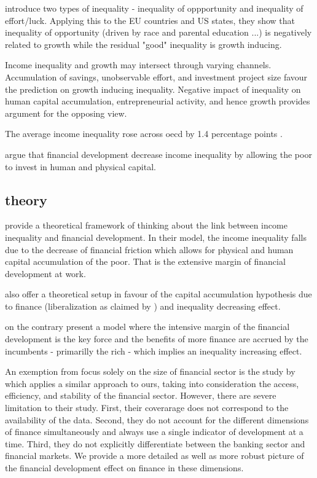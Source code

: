 \documentclass[a4paper,11pt]{article}
\begin{document}
\citet{marrero2013inequality} introduce two types of inequality - inequality of oppportunity and inequality of effort/luck. Applying this to the EU countries and US states, they show that inequality of opportunity (driven by race and parental education ...) is negatively related to growth while the residual "good" inequality is growth inducing.

Income inequality and growth may intersect through varying channels. Accumulation of savings, unobservable effort, and investment project size favour the prediction on growth inducing inequality. Negative impact of inequality on human capital accumulation, entrepreneurial activity, and hence growth provides argument for the opposing view.

The average income inequality rose across \ac{oecd} by 1.4 percentage points \citep{oecd2013crisis}.

\citet{LawSingh2014} argue that financial development decrease income inequality by allowing the poor to invest in human and physical capital.

\subsection{theory}
\citet{galormoav2004} provide a theoretical framework of thinking about the link between income inequality and financial development. In their model, the income inequality falls due to the decrease of financial friction which allows for physical and human capital accumulation of the poor. That is the extensive margin of financial development at work.

\citet{banerjeenewman1990} also offer a theoretical setup in favour of the capital accumulation hypothesis due to finance (liberalization as claimed by \citet{de2017finance}) and inequality decreasing effect.

\citet{GreenwoodJovanovic1990} on the contrary present a model where the intensive margin of the financial development is the key force and the benefits of more finance are accrued by the incumbents - primarilly the rich - which implies an inequality increasing effect.

An exemption from focus solely on the size of financial sector is the study by \citet{naceurzhang2016} which applies a similar approach to ours, taking into consideration the access, efficiency, and stability of the financial sector. However, there are severe limitation to their study. First, their coverarage does not correspond to the availability of the data. Second, they do not account for the different dimensions of finance simultaneously and always use a single indicator of development at a time. Third, they do not explicitly differentiate between the banking sector and financial markets. We provide a more detailed as well as more robust picture of the financial development effect on finance in these dimensions.
\end{document}
